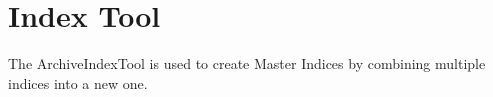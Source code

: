 \section{Index Tool}
The ArchiveIndexTool is used to create Master Indices by combining multiple indices
into a new one.
